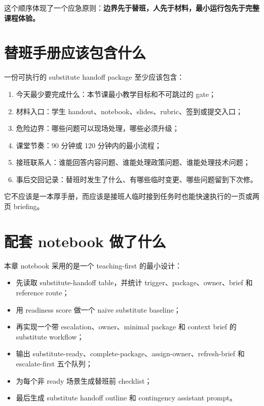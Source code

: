 这个顺序体现了一个应急原则：\textbf{边界先于替班，人先于材料，最小运行包先于完整课程体验。}

\section{替班手册应该包含什么}

一份可执行的 substitute handoff package 至少应该包含：

\begin{enumerate}
    \item 今天最少要完成什么：本节课最小教学目标和不可跳过的 gate；
    \item 材料入口：学生 handout、notebook、slides、rubric、签到或提交入口；
    \item 危险边界：哪些问题可以现场处理，哪些必须升级；
    \item 课堂节奏：90 分钟或 120 分钟内的最小流程；
    \item 接班联系人：谁能回答内容问题、谁能处理政策问题、谁能处理技术问题；
    \item 事后交回记录：替班时发生了什么、有哪些临时变更、哪些问题留到下次修。
\end{enumerate}

它不应该是一本厚手册，而应该是接班人临时接到任务时也能快速执行的一页或两页 briefing。

\section{配套 notebook 做了什么}

本章 notebook 采用的是一个 teaching-first 的最小设计：

\begin{itemize}
    \item 先读取 substitute-handoff table，并统计 trigger、package、owner、brief 和 reference route；
    \item 用 readiness score 做一个 naive substitute baseline；
    \item 再实现一个带 escalation、owner、minimal package 和 context brief 的 substitute workflow；
    \item 输出 substitute-ready、complete-package、assign-owner、refresh-brief 和 escalate-first 五个队列；
    \item 为每个非 ready 场景生成替班前 checklist；
    \item 最后生成 substitute handoff outline 和 contingency assistant prompt。
\end{itemize}

